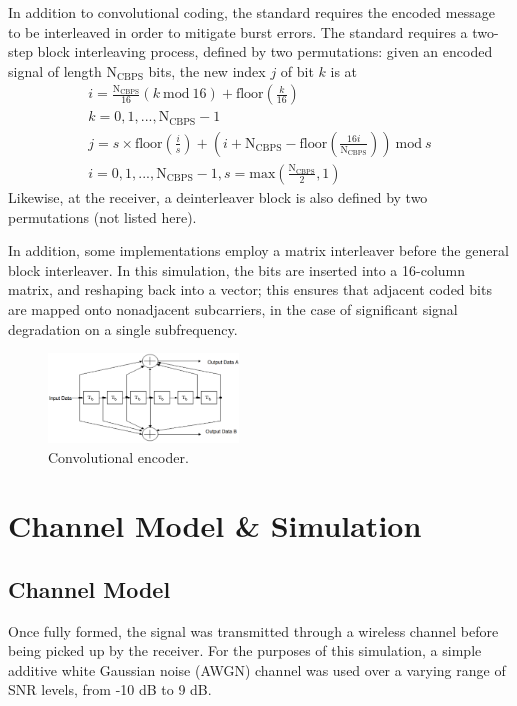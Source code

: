 \documentclass[journal]{IEEEtran}
\begin{document}
In addition to convolutional coding, the standard requires the encoded message to be interleaved in order to mitigate burst errors. The standard requires a two-step block interleaving process, defined by two permutations: given an encoded signal of length $\text{N}_\text{CBPS}$ bits, the new index $j$ of bit $k$ is at
\begin{eqnarray}
\nonumber i = \frac{\text{N}_\text{CBPS}}{16}(k~\text{mod}~16) + \nonumber \text{floor}(\frac{k}{16}) \\
\nonumber k = 0,1,...,\text{N}_\text{CBPS}-1 \\
\nonumber j = s \times \text{floor}(\frac{i}{s}) + (i + \text{N}_\text{CBPS} - \text{floor}(\frac{16i}{\text{N}_\text{CBPS}}))~\text{mod}~s \\
\nonumber i = 0,1,...,\text{N}_\text{CBPS}-1, s = \text{max}(\frac{\text{N}_\text{CBPS}}{2}, 1)
\end{eqnarray}
Likewise, at the receiver, a deinterleaver block is also defined by two permutations (not listed here).

In addition, some implementations employ a matrix interleaver before the general block interleaver. In this simulation, the bits are inserted into a 16-column matrix, and reshaping back into a vector; this ensures that adjacent coded bits are mapped onto nonadjacent subcarriers, in the case of significant signal degradation on a single subfrequency.

\begin{figure}
    \centering
    \includegraphics[width = 0.45\textwidth]{Trellis}
    \caption{Convolutional encoder.}
    \label{fig:trellis}
\end{figure}


\section{Channel Model \& Simulation} \label{sec:simulation}
\subsection{Channel Model}
Once fully formed, the signal was transmitted through a wireless channel before being picked up by the receiver. For the purposes of this simulation, a simple additive white Gaussian noise (AWGN) channel was used over a varying range of SNR levels, from -10 dB to 9 dB. 
\end{document}
